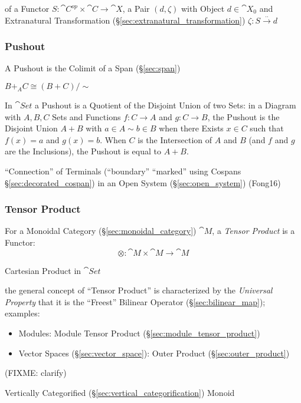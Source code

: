 of a Functor $S : \cat{C}^{op} \times \cat{C} \rightarrow
\cat{X}$, a Pair $(d, \zeta)$ with Object $d \in \cat{X}_0$ and
Extranatural Transformation (\S\ref{sec:extranatural_transformation})
$\zeta : S \xrightarrow{..} d$



\subsubsection{Pushout}\label{sec:pushout}

A Pushout is the Colimit of a Span (\S\ref{sec:span})

$B +_A C \cong (B + C)/\sim$

In $\cat{Set}$ a Pushout is a Quotient of the Disjoint Union of two
Sets: in a Diagram with $A,B,C$ Sets and Functions $f : C \rightarrow
A$ and $g : C \rightarrow B$, the Pushout is the Disjoint Union $A +
B$ with $a \in A \sim b \in B$ when there Exists $x \in C$ such that
$f(x) = a$ and $g(x) = b$. When $C$ is the Intersection of $A$ and $B$
(and $f$ and $g$ are the Inclusions), the Pushout is equal to $A + B$.

\fist ``Connection'' of Terminals (``boundary'' ``marked'' using
Cospans \S\ref{sec:decorated_cospan}) in an Open System
(\S\ref{sec:open_system}) (Fong16)



\subsubsection{Tensor Product}\label{sec:tensor_product}

For a Monoidal Category (\S\ref{sec:monoidal_category}) $\cat{M}$,
a \emph{Tensor Product} is a Functor:
\[
  \otimes : \cat{M} \times \cat{M} \rightarrow \cat{M}
\]

Cartesian Product in $\cat{Set}$

the general concept of ``Tensor Product'' is characterized by the
\emph{Universal Property} that it is the ``Freest'' Bilinear Operator
(\S\ref{sec:bilinear_map}); examples:
\begin{itemize}
\item Modules: Module Tensor Product (\S\ref{sec:module_tensor_product})
\item Vector Spaces (\S\ref{sec:vector_space}): Outer Product
  (\S\ref{sec:outer_product})
\end{itemize}
(FIXME: clarify)

Vertically Categorified (\S\ref{sec:vertical_categorification}) Monoid

